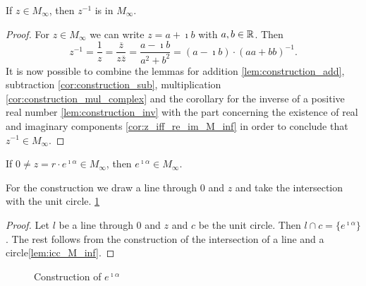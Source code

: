 \begin{corollary}
    \label{cor:inv_M_inf}
    \leanok
    If $z \in M_{\infty}$, then $z^{-1}$ is in  $M_{\infty}$.
\end{corollary}
\begin{proof}
    \leanok
    For $z \in M_{\infty}$ we can write $z = a + \imath b$ with $a, b \in \mathbb{R}$. Then
    $$z^{-1} = \frac{1}{z} = \frac{\overline{z}}{z\overline{z}} = \frac{a - \imath b}{a^2+b^2}= (a - \imath b) \cdot (aa+bb)^{-1}.$$
    It is now possible to combine the lemmas for addition \ref{lem:construction_add}, subtraction \ref{cor:construction_sub}, multiplication \ref{cor:construction_mul_complex} 
    and the corollary for the inverse of a positive real number \ref{lem:construction_inv} with the part concerning the existence of real and imaginary components \ref{cor:z_iff_re_im_M_inf} in order to conclude that $z^{-1} \in M_{\infty}$.
\end{proof}


\begin{lemma}
    \label{lem:angle_M_inf}
    \leanok
    If $0 \ne z = r\cdot e^{\imath\alpha} \in M_{\infty}$, then $e^{\imath\alpha} \in  M_{\infty}$.
\end{lemma}
For the construction we draw a line through $0$ and $z$ and take the intersection with the unit circle. \ref{Fig.angle}

\begin{proof}
    \leanok
    Let $l$ be a line through $0$ and $z$ and $c$ be the unit circle. Then $l \cap c = \{e^{\imath\alpha}\}$.
    The rest follows from the construction of the intersection of a line and a circle\ref{lem:icc_M_inf}.
\end{proof}

\begin{figure}[h]
    \centering
    \caption{Construction of $e^{\imath\alpha}$}
    \label{Fig.angle}
\end{figure}


